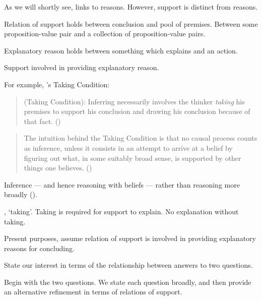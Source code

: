 \begin{note}
  As we will shortly see, links to reasons.
  However, support is distinct from reasons.

  Relation of support holds between conclusion and pool of premises.
  Between some proposition-value pair and a collection of proposition-value pairs.

  Explanatory reason holds between something which explains and an action.

  Support involved in providing explanatory reason.
\end{note}

\begin{note}
  For example, \citeauthor{Boghossian:2014aa}'s Taking Condition:

  \begin{quote}
    (Taking Condition):
    Inferring necessarily involves the thinker \emph{taking} his premises to support his conclusion and drawing his conclusion because of that fact.%
    \mbox{}\hfill\mbox{(\Citeyear[5]{Boghossian:2014aa})}
  \end{quote}

  \begin{quote}
    The intuition behind the Taking Condition is that no causal process counts as inference, unless it consists in an attempt to arrive at a belief by figuring out what, in some suitably broad sense, is supported by other things one believes.%
    \mbox{}\hfill\mbox{(\Citeyear[5]{Boghossian:2014aa})}
  \end{quote}

  Inference --- and hence reasoning with beliefs --- rather than reasoning more broadly (\Citeyear[cf][2]{Boghossian:2014aa}).

  \citeauthor{Boghossian:2014aa}, `taking'.
  Taking is required for support to explain.
  No explanation without taking.
\end{note}

\begin{note}
  Present purposes, assume relation of support is involved in providing explanatory reasons for concluding.
\end{note}

\begin{note}
  State our interest in terms of the relationship between answers to two questions.

  Begin with the two questions.
  We state each question broadly, and then provide an alternative refinement in terms of relations of support.
\end{note}


